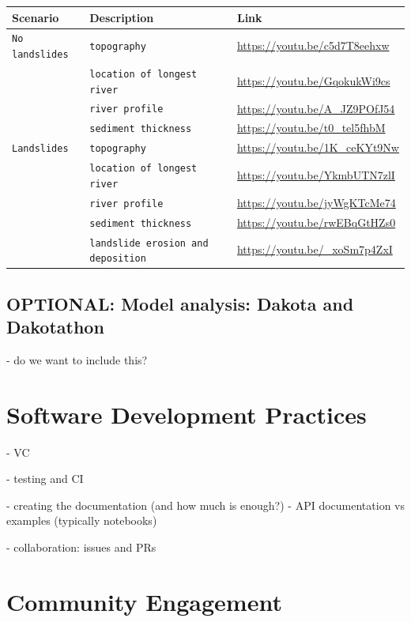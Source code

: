 \documentclass[12pt]{amsart}
\begin{document}
\begin{table}[htbp]
    \Small
    \begin{tabular}{lll}
        \hline
        Scenario & Description & Link\\
        \hline\hline
        \verb|No landslides| &\verb|topography | & \url{https://youtu.be/c5d7T8eehxw} \\
        \verb|| &\verb|location of longest river|& \url{https://youtu.be/GqokukWi9cs} \\
        \verb|| &\verb|river profile |& \url{https://youtu.be/A_JZ9POfJ54} \\
        \verb|| &\verb|sediment thickness |& \url{https://youtu.be/t0_tel5fhbM} \\
        
        \verb|Landslides| &\verb|topography | & \url{https://youtu.be/1K_ceKYt9Nw} \\
        \verb|| &\verb|location of longest river|& \url{https://youtu.be/YkmbUTN7zlI} \\
        \verb|| &\verb|river profile |& \url{https://youtu.be/jyWgKTcMe74} \\
        \verb|| &\verb|sediment thickness |& \url{https://youtu.be/rwEBqGtHZs0} \\
        \verb|| &\verb|landslide erosion and deposition |& \url{https://youtu.be/_xoSm7p4ZxI} \\
    \hline
   \end{tabular}
   \label{tab:LS-movies}
\end{table} 

\subsection{OPTIONAL: Model analysis: Dakota and Dakotathon}

- do we want to include this?

\section{Software Development Practices}

- VC

- testing and CI

- creating the documentation (and how much is enough?)
   - API documentation vs examples (typically notebooks)

- collaboration: issues and PRs


\section{Community Engagement}
\label{sec:community}
\end{document}
